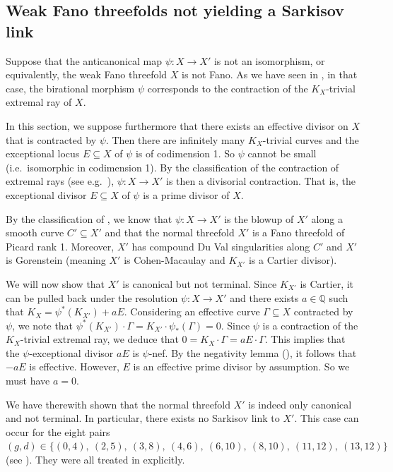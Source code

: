 \documentclass[english,11pt,reqno]{amsart}
\newcommand{\sub}{\subseteq}
\begin{document}
\subsection{Weak Fano threefolds not yielding a Sarkisov link} \label{subsection:no_flop}
%
Suppose that the anticanonical map $\psi:X\rightarrow X'$ is not an isomorphism, or equivalently, the weak Fano threefold $X$ is not Fano. As we have seen in , in that case, the birational morphism $\psi$ corresponds to the contraction of the $K_X$-trivial extremal ray of $X$. \par 
In this section, we suppose furthermore that there exists an effective divisor on $X$ that is contracted by $\psi$. Then there are infinitely many $K_X$-trivial curves and the exceptional locus $E\sub X$ of $\psi$ is of codimension 1. So $\psi$ cannot be small (i.e.\ isomorphic in codimension 1). By the classification of the contraction of extremal rays (see e.g.\ \cite[Prop.\ 2.5]{Mori_Kollar_Birational_geometry}), $\psi:X\rightarrow X'$ is then a divisorial contraction. That is, the exceptional divisor $E\sub X$ of $\psi$ is a prime divisor of $X$. \par
%
By the classification of \cite{Weak_Fano_threefolds_I-Jahnke_Peternell_Radloff}, we know that $\psi:X\rightarrow X'$ is the blowup of $X'$ along a smooth curve $C'\sub X'$ and that the normal threefold $X'$ is a Fano threefold of Picard rank 1. Moreover, $X'$ has compound Du Val singularities along $C'$ and $X'$ is Gorenstein (meaning $X'$ is Cohen-Macaulay and $K_{X'}$ is a Cartier divisor). \par
We will now show that $X'$ is canonical but not terminal. Since $K_{X'}$ is Cartier, it can be pulled back under the resolution $\psi:X\rightarrow X'$ and there exists $a\in \mathbb{Q}$ such that $K_X=\psi^*(K_{X'})+aE$.
Considering an effective curve $\Gamma \sub X$ contracted by $\psi$, we note that $\psi^*(K_{X'})\cdot \Gamma = K_{X'}\cdot \psi_*(\Gamma)=0$. Since $\psi$ is a contraction of the $K_X$-trivial extremal ray, we deduce that $0=K_X\cdot \Gamma= a E\cdot \Gamma$. This implies that the $\psi$-exceptional divisor $ aE$ is $\psi$-nef. By the negativity lemma (\cite[Thm.\ 1.3.9]{Complex_Algebraic_Threefolds_Kawakita}), it follows that $-aE$ is effective. However, $E$ is an effective prime divisor by assumption. So we must have $a=0$.  \par 
We have therewith shown that the normal threefold $X'$ is indeed only canonical and not terminal. In particular, there exists no Sarkisov link to $X'$. This case can occur for the eight pairs $(g,d)\in \{(0,4),\:(2,5),\:(3,8),\:(4,6),\:(6,10),\:(8,10),\:(11,12),\:(13,12)\}$ (see ). They were all treated in \cite{Weak_Fano_threefolds_I-Jahnke_Peternell_Radloff} explicitly.\par
\end{document}
